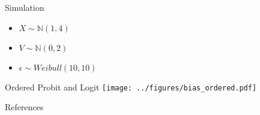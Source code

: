 \documentclass[xcolor=dvipsnames]{beamer}
\begin{document}
\begin{frame}{Simulation}
    \begin{itemize}
        \item $X \sim \mathbb{N}(1, 4)$
        \item $V \sim \mathbb{N}(0, 2)$
        \item $\epsilon \sim Weibull(10, 10)$
    \end{itemize}
\end{frame}

\begin{frame}{Ordered Probit and Logit}
    \texttt{[image: ../figures/bias\_ordered.pdf]}
\end{frame}
   
\begin{frame}[allowframebreaks]{References}\scriptsize


\end{frame}
\end{document}
